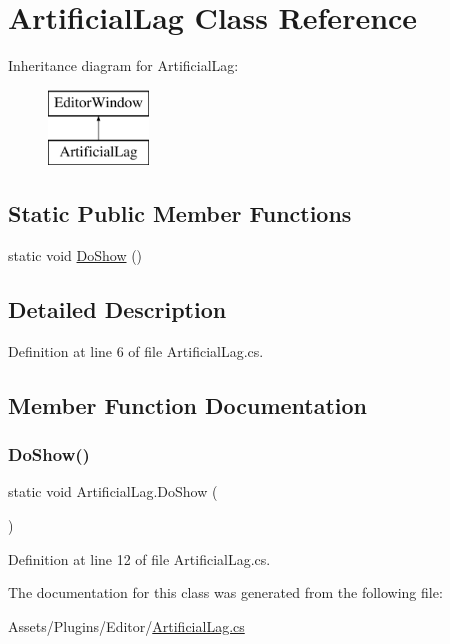 \hypertarget{class_artificial_lag}{}\section{Artificial\+Lag Class Reference}
\label{class_artificial_lag}
Inheritance diagram for Artificial\+Lag\+:\begin{figure}[H]
\begin{center}
\leavevmode
\includegraphics[height=2.000000cm]{class_artificial_lag}
\end{center}
\end{figure}
\subsection*{Static Public Member Functions}
\begin{DoxyCompactItemize}
\item 
static void \mbox{\hyperlink{class_artificial_lag_a8f358f0d0d60311fb4c4dc91ccf3171b}{Do\+Show}} ()
\end{DoxyCompactItemize}


\subsection{Detailed Description}


Definition at line 6 of file Artificial\+Lag.\+cs.



\subsection{Member Function Documentation}
\mbox{\label{class_artificial_lag_a8f358f0d0d60311fb4c4dc91ccf3171b}} 
\subsubsection{\texorpdfstring{Do\+Show()}{DoShow()}}
{\footnotesize\ttfamily static void Artificial\+Lag.\+Do\+Show (\begin{DoxyParamCaption}{ }\end{DoxyParamCaption})\hspace{0.3cm}{\ttfamily [static]}}



Definition at line 12 of file Artificial\+Lag.\+cs.



The documentation for this class was generated from the following file\+:\begin{DoxyCompactItemize}
\item 
Assets/\+Plugins/\+Editor/\mbox{\hyperlink{_artificial_lag_8cs}{Artificial\+Lag.\+cs}}\end{DoxyCompactItemize}
